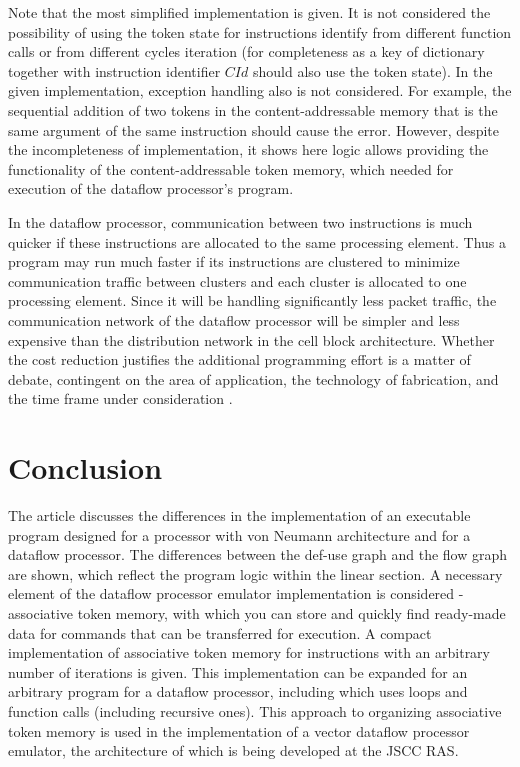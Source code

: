 \documentclass[
11pt,%
tightenlines,%
twoside,%
onecolumn,%
nofloats,%
nobibnotes,%
nofootinbib,%
superscriptaddress,%
noshowpacs,%
centertags]%
{revtex4}
\begin{document}
Note that the most simplified implementation is given.
It is not considered the possibility of using the token state for instructions identify from different function calls or from different cycles iteration (for completeness as a key of dictionary together with instruction identifier $CId$ should also use the token state).
In the given implementation, exception handling also is not considered.
For example, the sequential addition of two tokens in the content-addressable memory that is the same argument of the same instruction should cause the error.
However, despite the incompleteness of implementation, it shows here logic allows providing the functionality of the content-addressable token memory, which needed for execution of the dataflow processor’s program.

In the dataflow processor, communication between two instructions is much quicker if these instructions are allocated to the same processing element.
Thus a program may run much faster if its instructions are clustered to minimize communication traffic between clusters and each cluster is allocated to one processing element.
Since it will be handling significantly less packet traffic, the communication network of the dataflow processor will be simpler and less expensive than the distribution network in the cell block architecture.
Whether the cost reduction justifies the additional programming effort is a matter of debate, contingent on the area of application, the technology of fabrication, and the time frame under consideration \cite{Dennis}.

\section{Conclusion}

The article discusses the differences in the implementation of an executable program designed for a processor with von Neumann architecture and for a dataflow processor.
The differences between the def-use graph and the flow graph are shown, which reflect the program logic within the linear section.
A necessary element of the dataflow processor emulator implementation is considered - associative token memory, with which you can store and quickly find ready-made data for commands that can be transferred for execution.
A compact implementation of associative token memory for instructions with an arbitrary number of iterations is given.
This implementation can be expanded for an arbitrary program for a dataflow processor, including which uses loops and function calls (including recursive ones).
This approach to organizing associative token memory is used in the implementation of a vector dataflow processor emulator, the architecture of which is being developed at the JSCC RAS.
\end{document}
